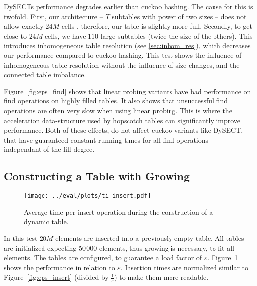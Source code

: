 \documentclass[a4paper,UKenglish]{lipics-v2016}
\begin{document}
DySECTs performance degrades earlier than cuckoo hashing.  The cause
for this is twofold. First, our architecture -- $T$ subtables with power
of two sizes -- does not allow exactly
$24M$ cells , therefore, our table is slightly more full. Secondly, to
get close to $24M$ cells, we have $110$ large subtables (twice the
size of the others).  This introduces inhomogeneous table resolution
(see \ref{sec:inhom_res}), which decreases our performance compared to
cuckoo hashing.  This test shows the influence of inhomogeneous table
resolution without the influence of size changes, and the connected
table imbalance.

Figure~\ref{fig:eps_find} shows that linear probing variants have bad
performance on find operations on highly filled tables.  It also shows
that unsuccessful find operations are often very slow when using
linear probing.  This is where the acceleration data-structure used by
hopscotch tables can significantly improve performance.  Both of these
effects, do not affect cuckoo variants like DySECT, that have
guaranteed constant running times for all find operations --
independant of the fill degree.

\subsection{Constructing a Table with Growing}
\label{sec:exp_ti}
\begin{figure}[ht]
  \centering
  \texttt{[image: ../eval/plots/ti\_insert.pdf]}
  \caption{\label{fig:ti_insert}Average time per insert operation
    during the construction of a dynamic table.}
\end{figure}
In this test $20M$ elements are inserted into a previously empty
table. All tables are initialized expecting 50\,000 elements, thus
growing is necessary, to fit all elements.  The tables are configured,
to guarantee a load factor of
$\varepsilon$. Figure~\ref{fig:ti_insert} shows the performance in
relation to $\varepsilon$.  Insertion times are normalized similar to
Figure~\ref{fig:eps_insert} (divided by $\frac{1}{\varepsilon}$) to
make them more readable.
\end{document}
